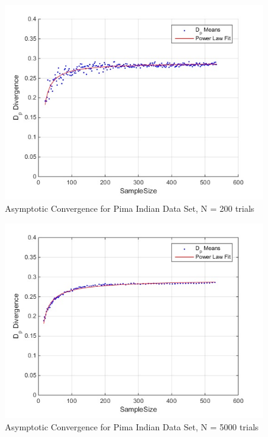 \documentclass{article}
\begin{document}
	\begin{figure}[!h]
		\caption{Asymptotic Convergence for Pima Indian Data Set, N = 200 trials}
		\centering
		\includegraphics[scale=0.6]{dp_n200_pima}
	\end{figure}	
	
	\begin{figure}[!h]
		\caption{Asymptotic Convergence for Pima Indian Data Set, N = 5000 trials}
		\centering
		\includegraphics[scale=0.6]{dp_n5000}
	\end{figure}	
	
\end{document}
